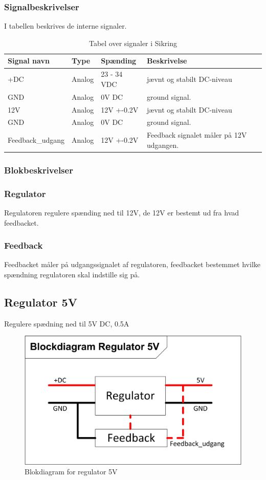 \subsubsection{Signalbeskrivelser}
I tabellen beskrives de interne signaler.
\begin{table}[H]
\begin{tabular}{|p{3cm}|p{3cm}|p{3cm}|p{4.5cm}|} \hline
\cellcolor[gray]{0.85}Signal navn& \cellcolor[gray]{0.85}Type &\cellcolor[gray]{0.85}Spænding&\cellcolor[gray]{0.85}Beskrivelse\\ \hline
+DC & Analog & 23 - 34 VDC & jævnt og stabilt DC-niveau\\  \hline
GND  & Analog & 0V DC & ground signal. \\  \hline
12V & Analog & 12V +-0.2V & jævnt og stabilt DC-niveau\\ \hline
GND & Analog & 0V DC & ground signal.\\ \hline
Feedback\_udgang & Analog & 12V +-0.2V & Feedback signalet måler på 12V udgangen.\\ \hline
\end{tabular}
\caption{Tabel over signaler i Sikring}
\label{table:udglatning}
\end{table}
\subsubsection{Blokbeskrivelser}
\subsubsection{Regulator}
Regulatoren regulere spænding ned til 12V, de 12V er bestemt ud fra hvad feedbacket. 
\subsubsection{Feedback}
Feedbacket måler på udgangssignalet af regulatoren, feedbacket bestemmet hvilke spændning regulatoren skal indstille sig på.
\newpage
\subsection{Regulator 5V}
Regulere spædning ned til 5V DC, 0.5A
\begin{figure}[H]
\centering
\includegraphics[scale=1]{billeder/Regulering_5VBlok}
\caption{Blokdiagram for regulator 5V}
\label{fig:regulator_5V}
\end{figure}
